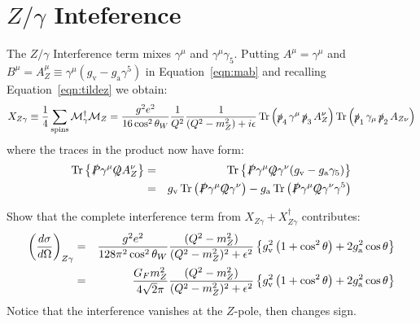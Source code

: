 \documentclass[12pt]{article}
\DeclareMathOperator{\Tr}{Tr}
\newcommand{\gv} {\ensuremath{g_{\mathrm v}}}
\newcommand{\ga} {\ensuremath{g_{\mathrm a}}}
\newcommand{\Ps} {\ensuremath{\slashed{P}}}
\newcommand{\Qs} {\ensuremath{\slashed{Q}}}
\newcommand{\ps}{\ensuremath{\slashed{p}}}
\begin{document}

%

\section{$Z/\gamma$ Inteference}

The $Z/\gamma$ Interference term mixes $\gamma^\mu$ and $\gamma^\mu\gamma_5$.  Putting $A^\mu=\gamma^\mu$ and $B^\mu = A_Z^\mu \equiv \gamma^\mu(\gv-\ga\gamma^5)$ in Equation~\ref{eqn:mab} and recalling Equation~\ref{eqn:tildez} we obtain:
\begin{equation}
X_{Z\gamma} \equiv \frac{1}{4} \sum_{\rm spins} \mathcal{M}_\gamma^\dagger \mathcal{M}_Z = 
\frac{g^2 e^2}{16\cos^2\theta_W} \frac{1}{Q^2}\frac{1}{(Q^2-m_Z^2)+i\epsilon}\Tr\left( \ps_4 \, \gamma^\mu \, \ps_3\, A_Z^\nu \right) \Tr\left( \ps_1 \, \gamma_\mu \, \ps_2 \, A_{Z\nu} \right) \label{eqn:maz}
\end{equation}
where the traces in the product now have form:
\begin{eqnarray}
\Tr\left\{\Ps\gamma^\mu\Qs A_Z^\nu\right\} &=& \Tr\left\{\Ps\gamma^\mu\Qs\gamma^\nu(\gv-\ga\gamma_5) \right\} \notag \\
&=& \gv \Tr\left(\Ps\gamma^\mu\Qs\gamma^\nu\right)-\ga\Tr\left(\Ps\gamma^\mu\Qs\gamma^\nu\gamma^5\right)
\end{eqnarray}
\begin{Exercise}
Show that the complete interference term from $X_{Z\gamma} + X_{Z\gamma}^\dagger$ contributes:
\begin{eqnarray}
\left( \frac{d\sigma}{d\Omega} \right)_{Z\gamma} &=&  \frac{g^2 e^2}{128 \pi^2 \cos^2\theta_W} \frac{(Q^2-m_Z^2)}{(Q^2-m_Z^2)^2+\epsilon^2}\left\{ \gv^2 \left(1 + \cos^2 \theta \right) + 2 \ga^2 \cos\theta\right\} \notag \\
&=&  \frac{G_F m_Z^2}{4 \sqrt{2} \pi} \frac{(Q^2-m_Z^2)}{(Q^2-m_Z^2)^2+\epsilon^2}\left\{ \gv^2 \left(1 + \cos^2 \theta \right) + 2 \ga^2 \cos\theta\right\} \label{eqn:dsigmazg}
\end{eqnarray} 
Notice that the interference vanishes at the $Z$-pole, then changes sign.   
\end{Exercise}
\end{document}

